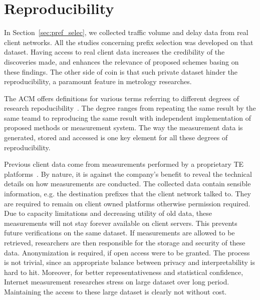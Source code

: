 \section{Reproducibility}
In Section~\ref{sec:pref_selec}, we collected traffic volume and delay data from real client networks. All the studies concerning prefix selection was developed on that dataset.
Having access to real client data increases the credibility of the discoveries made, and enhances the relevance of proposed schemes basing on these findings.
The other side of coin is that such private dataset hinder the reproducibility, a paramount feature in metrology researches.

The \acf{ACM} offers definitions for various terms referring to different degrees of research repoducibility~\cite{acm}.
The degree ranges from repeating the same result by the same teamd to reproducing the same result with independent implementation of proposed methods or measurement system.
The way the measurement data is generated, stored and accessed is one key element for all these degrees of reproducibility.

Previous client data come from measurements performed by a proprietary TE platforms~\cite{b6}.
By nature, it is against the company's benefit to reveal the technical details on how measurements are conducted. 
The collected data contain sensible information, e.g. the destination prefixes that the client network talked to.
They are required to remain on client owned platforms otherwise permission required. 
Due to capacity limitations and decreasing utility of old data, these measurements will not stay forever available on client servers. 
This prevents future verifications on the same dataset.
If measurements are allowed to be retrieved, researchers are then responsible for the storage and security of these data. 
Anonymization is required, if open access were to be granted. 
The process is not trivial, since an appropriate balance between privacy and interpretability is hard to hit. 
Moreover, for better representativeness and statistical confidence, Internet measurement researches stress on large dataset over long period. 
Maintaining the access to these large dataset is clearly not without cost. 


